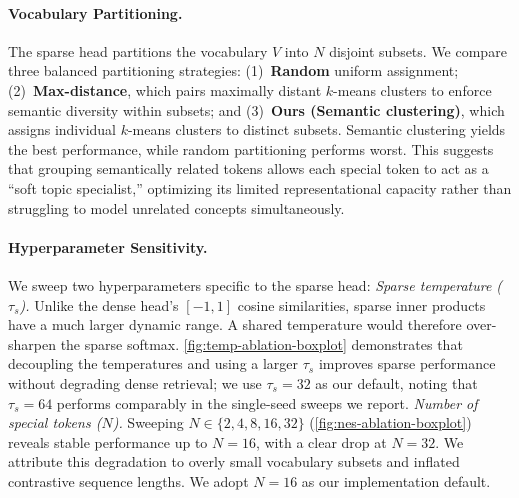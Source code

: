 \paragraph{Vocabulary Partitioning.}
The sparse head partitions the vocabulary $V$ into $N$ disjoint subsets. We compare three balanced partitioning strategies: (1)~\textbf{Random} uniform assignment; (2)~\textbf{Max-distance}, which pairs maximally distant $k$-means clusters to enforce semantic diversity within subsets; and (3)~\textbf{Ours (Semantic clustering)}, which assigns individual $k$-means clusters to distinct subsets. Semantic clustering yields the best performance, while random partitioning performs worst. This suggests that grouping semantically related tokens allows each special token to act as a ``soft topic specialist,'' optimizing its limited representational capacity rather than struggling to model unrelated concepts simultaneously.

\paragraph{Hyperparameter Sensitivity.}
We sweep two hyperparameters specific to the sparse head:
\textit{Sparse temperature ($\tau_s$).} Unlike the dense head's $[-1,1]$ cosine similarities, sparse inner products have a much larger dynamic range. A shared temperature would therefore over-sharpen the sparse softmax. \autoref{fig:temp-ablation-boxplot} demonstrates that decoupling the temperatures and using a larger $\tau_s$ improves sparse performance without degrading dense retrieval; we use $\tau_s{=}32$ as our default, noting that $\tau_s{=}64$ performs comparably in the single-seed sweeps we report. 
\textit{Number of special tokens ($N$).} Sweeping $N \in \{2,4,8,16,32\}$ (\autoref{fig:nes-ablation-boxplot}) reveals stable performance up to $N{=}16$, with a clear drop at $N{=}32$. We attribute this degradation to overly small vocabulary subsets and inflated contrastive sequence lengths. We adopt $N{=}16$ as our implementation default. 

